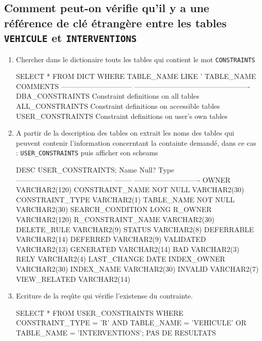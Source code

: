 \documentclass[•]{article}
\begin{document}
\subsection{Comment peut-on vérifie qu’il y a une référence de clé étrangère entre les tables \texttt{VEHICULE} et
\texttt{INTERVENTIONS}}
\begin{enumerate}
	\item Chercher dans le dictionaire touts les tables qui contient le mot \texttt{CONSTRAINTS}
	\begin{sql}
SELECT * FROM DICT WHERE TABLE_NAME LIKE '%
TABLE_NAME		       COMMENTS
------------------------------ -------------------------------------------------
DBA_CONSTRAINTS 	       Constraint definitions on all tables
ALL_CONSTRAINTS 	       Constraint definitions on accessible tables
USER_CONSTRAINTS	       Constraint definitions on user's own tables
	\end{sql}
	\item A partir de la description des tables on extrait les noms des tables qui peuvent contenir l'information concerntant la containte demandé, dans ce cas : \texttt{USER\_CONSTRAINTS} puis afficher son scheams
	\begin{sql}
DESC USER_CONSTRAINTS;
 Name                                      Null?    Type
 ----------------------------------------- -------- ----------------------------
 OWNER                                              VARCHAR2(120)
 CONSTRAINT_NAME                           NOT NULL VARCHAR2(30)
 CONSTRAINT_TYPE                                    VARCHAR2(1)
 TABLE_NAME                                NOT NULL VARCHAR2(30)
 SEARCH_CONDITION                                   LONG
 R_OWNER                                            VARCHAR2(120)
 R_CONSTRAINT_NAME                                  VARCHAR2(30)
 DELETE_RULE                                        VARCHAR2(9)
 STATUS                                             VARCHAR2(8)
 DEFERRABLE                                         VARCHAR2(14)
 DEFERRED                                           VARCHAR2(9)
 VALIDATED                                          VARCHAR2(13)
 GENERATED                                          VARCHAR2(14)
 BAD                                                VARCHAR2(3)
 RELY                                               VARCHAR2(4)
 LAST_CHANGE                                        DATE
 INDEX_OWNER                                        VARCHAR2(30)
 INDEX_NAME                                         VARCHAR2(30)
 INVALID                                            VARCHAR2(7)
 VIEW_RELATED                                       VARCHAR2(14)
	\end{sql}
	\item Ecriture de la reqûte qui vérifie l'existense du contrainte.
	\begin{sql}
 SELECT *
 FROM USER_CONSTRAINTS
 WHERE CONSTRAINT_TYPE = 'R' AND TABLE_NAME = 'VEHICULE' OR TABLE_NAME = 'INTERVENTIONS';
PAS DE RESULTATS
	\end{sql}
\end{enumerate}
\end{document}
